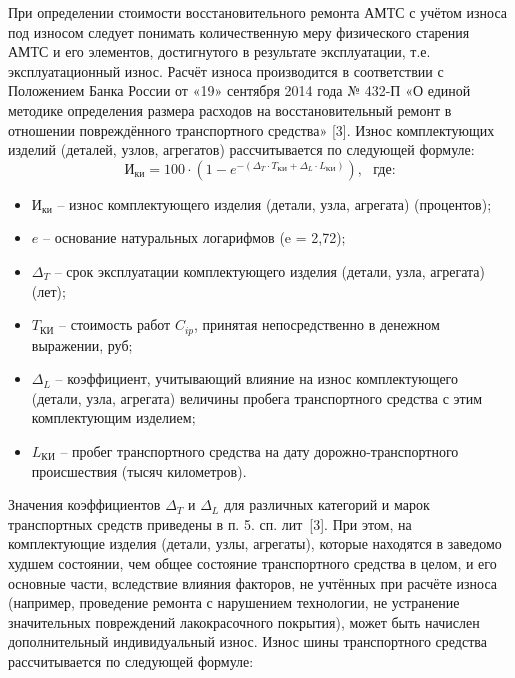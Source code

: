 \par При определении стоимости восстановительного ремонта АМТС с учётом износа под износом следует понимать количественную меру физического старения АМТС и его элементов, достигнутого в результате эксплуатации, т.е. эксплуатационный износ.
%
Расчёт износа производится в  соответствии с Положением Банка России от «19» сентября 2014 года № 432-П «О единой методике определения размера расходов на восстановительный ремонт в отношении повреждённого транспортного средства» [3].
Износ комплектующих изделий (деталей, узлов, агрегатов) рассчитывается по следующей формуле:
%
%
%
\begin{equation}\label{eq:I}
\text{И}_{\text{ки}} 
= 100\cdot\left( 1-e^ {-\left( \Delta_{T} \cdot T_{\text{КИ}} + \Delta_{L} \cdot L_{\text{КИ}} \right)}\right), \,\,\,\,\text{где:}   
\end{equation}
%
\begin{itemize}
	\item[ ]$ \text{И}_{\text{ки}} $ -- износ комплектующего изделия (детали, узла, агрегата) (процентов); 
	\item[ ]$ e $ -- основание натуральных логарифмов (e =  2,72);
	\item[ ]$ \Delta_{T}$ --  срок эксплуатации комплектующего изделия (детали, узла, агрегата) (лет);
	\item[ ]$ T_{\text{КИ}} $ -- стоимость работ $ C_{ip} $, принятая непосредственно в денежном выражении, руб;
	\item[ ]$ \Delta_{L} $ -- коэффициент, учитывающий влияние на износ комплектующего (детали, узла, агрегата) величины пробега транспортного средства с этим комплектующим изделием;
	\item[ ]$ L_{\text{КИ}} $ -- пробег транспортного средства на дату дорожно-транспортного происшествия (тысяч километров).  
\end{itemize}
\vspace{5mm}
\par Значения коэффициентов $ \Delta_{T}$  и $ \Delta_{L} $  для различных категорий и марок транспортных средств приведены в п. 5. сп. лит~[3]. При этом, на комплектующие изделия (детали, узлы, агрегаты), которые находятся в заведомо худшем состоянии, чем общее состояние транспортного средства в целом, и его основные части, вследствие влияния факторов, не учтённых при расчёте износа (например, проведение ремонта с нарушением технологии, не устранение значительных повреждений лакокрасочного покрытия), может быть начислен дополнительный индивидуальный износ. 
Износ шины транспортного средства рассчитывается по следующей формуле:
